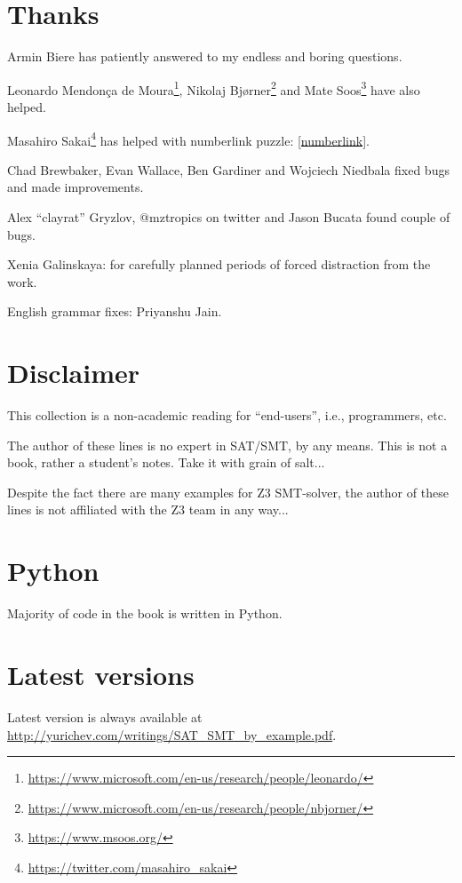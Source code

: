 \section{Thanks}

Armin Biere has patiently answered to my endless and boring questions.

Leonardo Mendonça de Moura\footnote{\url{https://www.microsoft.com/en-us/research/people/leonardo/}},
Nikolaj Bjørner\footnote{\url{https://www.microsoft.com/en-us/research/people/nbjorner/}}
and Mate Soos\footnote{\url{https://www.msoos.org/}} have also helped.

Masahiro Sakai\footnote{\url{https://twitter.com/masahiro_sakai}} has helped with numberlink puzzle: \ref{numberlink}.

Chad Brewbaker, Evan Wallace, Ben Gardiner and Wojciech Niedbala fixed bugs and made improvements.

Alex ``clayrat'' Gryzlov, @mztropics on twitter and Jason Bucata found couple of bugs.

Xenia Galinskaya: for carefully planned periods of forced distraction from the work.

English grammar fixes: Priyanshu Jain.

\section{Disclaimer}

This collection is a non-academic reading for ``end-users'', i.e., programmers, etc.

The author of these lines is no expert in SAT/SMT, by any means.
This is not a book, rather a student's notes.
Take it with grain of salt...

Despite the fact there are many examples for Z3 SMT-solver,
the author of these lines is not affiliated with the Z3 team in any way...

\section{Python}

Majority of code in the book is written in Python.

\section{Latest versions}

Latest version is always available at \url{http://yurichev.com/writings/SAT_SMT_by_example.pdf}.

